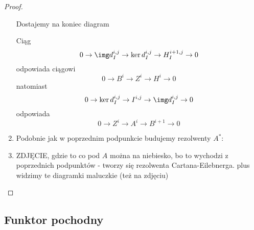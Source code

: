 \begin{proof}
\begin{enumerate}
\begin{center}
\end{center}
      Dostajemy na koniec diagram 
      \begin{center}\end{center}
    Ciąg 
      $$0\to\img d_I^{i,j}\to \ker d_I^{i,j}\to H_I^{i+1,j}\to 0$$ 
      odpowiada ciągowi 
      $$0\to B^i\to Z^i\to H^i\to 0$$
      natomiast 
      $$0\to \ker d_I^{i,j}\to I^{i,j}\to \img d_I^{i,j}\to 0$$
      odpowiada
      $$0\to Z^i\to A^i\to B^{i+1}\to 0$$
    \item Podobnie jak w poprzednim podpunkcie budujemy rezolwenty $A^*$:
      \begin{center}\end{center}
    \item {\large\color{red}ZDJĘCIE}, gdzie to co pod $A$ można na niebiesko, bo to wychodzi z poprzednich podpunktów - tworzy się rezolwenta Cartana-Eilebnerga. plus widzimy te diagramki maluczkie (też na zdjęciu)
  \end{enumerate}
\end{proof}

\subsection{Funktor pochodny}

